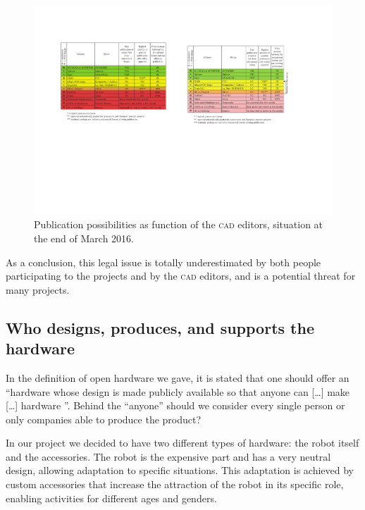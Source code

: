 \documentclass[letterpaper, 10 pt, conference]{ieeeconf}  %
\begin{document}
\begin{figure}
\centering
\includegraphics[width=\columnwidth]{figures/table}
\caption{Publication possibilities as function of the \textsc{cad} editors, situation at the end of March 2016.}
\label{fig:editors}
\end{figure}

As a conclusion, this legal issue is totally underestimated by both people participating to the projects and by the \textsc{cad} editors, and is a potential threat for many projects. 

\subsection{Who designs, produces, and supports the hardware}

In the definition of open hardware we gave, it is stated that one should offer an ``hardware whose design is made publicly available so that anyone can [\dots] make [\dots] hardware ''.
Behind the ``anyone'' should we consider every single person or only companies able to produce the product?

In our project we decided to have two different types of hardware: the robot itself and the accessories. %
The robot is the expensive part and has a very neutral design, allowing adaptation to specific situations.
This adaptation is achieved by custom accessories that increase the attraction of the robot in its specific role, enabling activities for different ages and genders.
\end{document}
